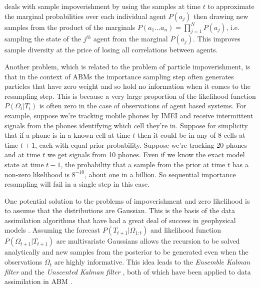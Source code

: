 \documentclass{article}
\begin{document}
\citet{wang_data_2015} deals with sample impoverishment by using the samples at time $t$ to approximate the marginal probabilities over each individual agent $P(a_j)$ then drawing new samples from the product of the marginals $P(a_1 \dots a_n) = \prod_{j=1}^NP(a_j)$, i.e. sampling the state of the $j^{th}$ agent from the marginal $P(a_j)$. This improves sample diversity at the price of losing all correlations between agents. 

Another problem, which is related to the problem of particle impoverishment, is that in the context of ABMs the importance sampling step often generates particles that have zero weight and so hold no information when it comes to the resampling step. This is because a very large proportion of the likelihood function $P(\Omega_t|T_t)$ is often zero in the case of observations of agent based systems. For example, suppose we're tracking mobile phones by IMEI and receive intermittent signals from the phones identifying which cell they're in. Suppose for simplicity that if a phone is in a known cell at time $t$ then it could be in any of 8 cells at time $t+1$, each with equal prior probability. Suppose we're tracking 20 phones and at time $t$ we get signals from 10 phones. Even if we know the exact model state at time $t-1$, the probability that a sample from the prior at time $t$ has a non-zero likelihood is $8^{-10}$, about one in a billion. So sequential importance resampling will fail in a single step in this case.

One potential solution to the problems of impoverishment and zero likelihood is to assume that the distributions are Gaussian. This is the basis of the data assimilation algorithms that have had a great deal of success in geophysical models \citet*{carrassi2018data, talagrand_assimilation_1997, kalnay_atmospheric_2003, lewis_dynamic_2006}. Assuming the forecast $P(T_{t+1}|\Omega_{1:t})$ and likelihood function $P(\Omega_{t+1}|T_{t+1})$ are multivariate Gaussians allows the recursion to be solved analytically and new samples from the posterior to be generated even when the observations $\Omega_t$ are highly informative. This idea leads to the \textit{Ensemble Kalman filter} \citep{evensen2003ensemble} and the \textit{Unscented Kalman filter} \citep{wan2001unscented}, both of which have been applied to data assimilation in ABM \citep*{ward_dynamic_2016, clay_realtime_2020}.
\end{document}
